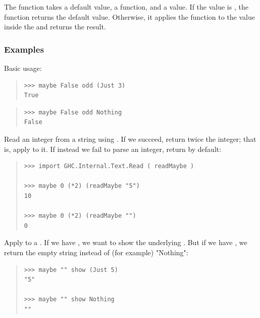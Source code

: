 \begin{haddockdesc}
\item[\begin{tabular}{@{}l}
maybe :: b -> (a -> b) -> Maybe a -> b
\end{tabular}]
{\haddockbegindoc
The  function takes a default value, a function, and a 
 value.  If the  value is , the function returns the
 default value.  Otherwise, it applies the function to the value inside
 the  and returns the result.\par
\subsubsection*{\textbf{Examples}}
Basic usage:\par
\begin{quote}
{\haddockverb\begin{verbatim}
>>> maybe False odd (Just 3)
True

\end{verbatim}}
\end{quote}
\begin{quote}
{\haddockverb\begin{verbatim}
>>> maybe False odd Nothing
False

\end{verbatim}}
\end{quote}
Read an integer from a string using . If we succeed,
 return twice the integer; that is, apply  to it. If instead
 we fail to parse an integer, return  by default:\par
\begin{quote}
{\haddockverb\begin{verbatim}
>>> import GHC.Internal.Text.Read ( readMaybe )

>>> maybe 0 (*2) (readMaybe "5")
10

>>> maybe 0 (*2) (readMaybe "")
0

\end{verbatim}}
\end{quote}
Apply  to a . If we have , we want to show
 the underlying  . But if we have , we return the
 empty string instead of (for example) "Nothing":\par
\begin{quote}
{\haddockverb\begin{verbatim}
>>> maybe "" show (Just 5)
"5"

>>> maybe "" show Nothing
""

\end{verbatim}}
\end{quote}}
\end{haddockdesc}
